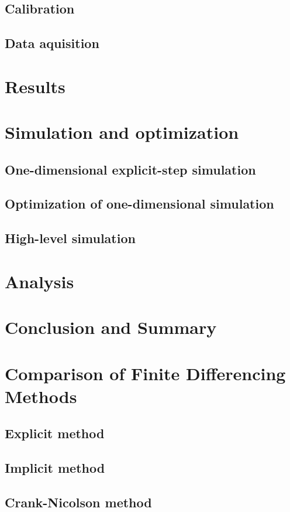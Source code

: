 \documentclass[letterpaper,titlepage,oneside]{report}
\begin{document}
\section{Calibration}

\section{Data aquisition}

\chapter{Results}
\label{ch:results}

\chapter{Simulation and optimization}
\label{ch:simulation}

\section{One-dimensional explicit-step simulation}

\section{Optimization of one-dimensional simulation}

\section{High-level simulation}

\chapter{Analysis}
\label{ch:analysis}

\chapter{Conclusion and Summary}
\label{ch:conclusion}

\appendix


\chapter{Comparison of Finite Differencing Methods}
\label{ch:finitediff}

\section{Explicit method}

\section{Implicit method}

\section{Crank-Nicolson method}
\end{document}

